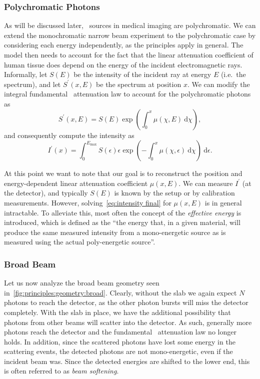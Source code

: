 \documentclass[../ml-tct.tex]{subfiles}
\begin{document}
\subsubsection{Polychromatic Photons}\label{sssec:principles:polychromatic}
As will be discussed later, \xray\ sources in medical imaging are polychromatic.
We can extend the monochromatic narrow beam experiment to the polychromatic case by considering each energy independently, as the principles apply in general.
The model then needs to account for the fact that the linear attenuation coefficient of human tissue does depend on the energy of the incident electromagnetic rays.
Informally, let \( S(E) \) be the intensity of the incident ray at energy \( E \) (i.e.\ the spectrum), and let \( S^\prime(x, E) \) be the spectrum at position \( x \).
We can modify the integral fundamental \xray\ attenuation law to account for the polychromatic photons as
\begin{equation}
	S^\prime(x, E) = S(E) \exp{\left( \int_0^x \mu(\chi, E)\ \mathrm{d} \chi \right)},
\end{equation}
and consequently compute the intensity as
\begin{equation}
	I^\prime(x) = \int_0^{E_\text{max}} S(\epsilon)\epsilon \exp{\left( -\int_0^x \mu(\chi, \epsilon)\ \mathrm{d} \chi\right)}\ \mathrm{d} \epsilon.%
	\label{eq:intensity final}
\end{equation}

At this point we want to note that our goal is to reconstruct the position and energy-dependent linear attenuation coefficient \( \mu(x, E) \).
We can measure \( I^\prime \) (at the detector), and typically \( S(E) \) is known by the setup or by calibration measurements.
However, solving~\cref{eq:intensity final} for \( \mu(x ,E) \) is in general intractable.
To alleviate this, most often the concept of the \emph{effective energy} is introduced, which is defined as the \enquote{the energy that, in a given material, will produce the same measured intensity from a mono-energetic source as is measured using the actual poly-energetic source}.
\subsubsection{Broad Beam}
Let us now analyze the broad beam geometry seen in~\cref{fig:principles:geometry:broad}.
Clearly, without the slab we again expect \( N \) photons to reach the detector, as the other photon bursts will miss the detector completely.
With the slab in place, we have the additional possibility that photons from other beams will scatter into the detector.
As such, generally more photons reach the detector and the fundamental \xray\ attenuation law no longer holds.
In addition, since the scattered photons have lost some energy in the scattering events, the detected photons are not mono-energetic, even if the incident beam was.
Since the detected energies are shifted to the lower end, this is often referred to as \emph{beam softening}.
\end{document}
